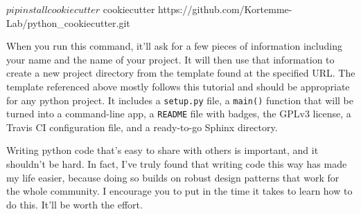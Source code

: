 \documentclass{article}
\begin{document}
\begin{bashcode}
$ pip install cookiecutter
$ cookiecutter https://github.com/Kortemme-Lab/python_cookiecutter.git
\end{bashcode}

When you run this command, it'll ask for a few pieces of information including 
your name and the name of your project.  It will then use that information to 
create a new project directory from the template found at the specified URL.  
The template referenced above mostly follows this tutorial and should be 
appropriate for any python project.  It includes a \texttt{setup.py} file, a 
\texttt{main()} function that will be turned into a command-line app, a 
\texttt{README} file with badges, the GPLv3 license, a Travis CI configuration 
file, and a ready-to-go Sphinx directory.

Writing python code that's easy to share with others is important, and it 
shouldn't be hard.  In fact, I've truly found that writing code this way has 
made my life easier, because doing so builds on robust design patterns that 
work for the whole community.  I encourage you to put in the time it takes to 
learn how to do this.  It'll be worth the effort.
\end{document}
